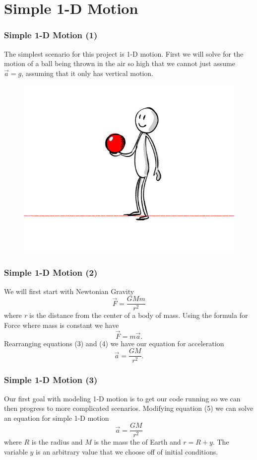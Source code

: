\documentclass{beamer}
\begin{document}
\section{Simple 1-D Motion}
\begin{frame}
\frametitle{Simple 1-D Motion (1)}
The simplest scenario for this project is 1-D motion. First we will solve for the motion of a ball being thrown in the air so high that we cannot just assume $\vec{a}=g$, assuming that it only has vertical motion.
\begin{figure}[htbp]
\begin{center}
\includegraphics[width=0.50\linewidth]{Cartoon1.jpg}
\end{center}
\end{figure}
\end{frame}
\begin{frame}
\frametitle{Simple 1-D Motion (2)}
We will first start with Newtonian Gravity
\begin{equation}\label{3}
\vec{F}=\frac{GMm}{r^2}
\end{equation}
where \textit{r} is the distance from the center of a body of mass. Using the formula for Force where mass is constant we have
\begin{equation}\label{4}
\vec{F}=m\vec{a}.
\end{equation}
Rearranging equations (3) and (4) we have our equation for acceleration
\begin{equation}\label{5}
\vec{a}=\frac{GM}{r^2}.
\end{equation}
\end{frame}
\begin{frame}
\frametitle{Simple 1-D Motion (3)}
Our first goal with modeling 1-D motion is to get our code running so we can then progress to more complicated scenarios. Modifying equation (5) we can solve an equation for simple 1-D motion
\begin{equation}\label{6}
\vec{a}=\frac{GM}{r^2}
\end{equation}
where $R$ is the radius and $M$ is the mass the of Earth and $r=R+y$. The variable $y$ is an arbitrary value that we choose off of initial conditions.
\end{frame}
\end{document}
